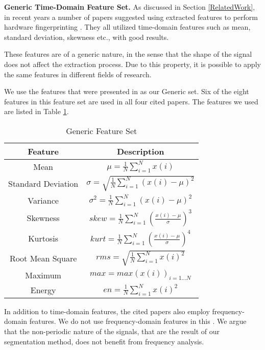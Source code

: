 \documentclass[compsoc,conference,a4paper,10pt,times]{IEEEtran}
\begin{document}
{\bf Generic Time-Domain Feature Set.}
  As discussed in Section \ref{RelatedWork}, in recent years a number of papers suggested using extracted features to perform hardware fingerprinting \cite{dey2014accelprint, choi2018identifying, choi2018voltageids, kneib2018scission}. They all utilized time-domain features such as mean, standard deviation, skewness etc., with good results.
  
  These features are of a generic nature, in the sense that the shape of the signal does not affect the extraction process. Due to this property, it is possible to apply the same features in different fields of research.
  
  We use the features that were presented in \cite{kneib2018scission} as our Generic set. Six of the eight features in this feature set are used in all four cited papers. The features we used are listed in Table \ref{tab:generic_feature_set}.
  
  \begin{table}
    \caption{Generic Feature Set}
    \label{tab:generic_feature_set}
    \centering
    \begin{tabular}{|c c|} 
      \hline
      Feature & Description \\ [0.5ex] 
      \hline\hline
      Mean & \(\mu = \frac{1}{N}\sum_{i=1}^{N}x(i)\) \\
      \hline
      Standard Deviation & \(\sigma = \sqrt{\frac{1}{N}\sum_{i=1}^{N}(x(i)-\mu)^2}\) \\
      \hline
      Variance & \(\sigma^2 = \frac{1}{N}\sum_{i=1}^{N}(x(i)-\mu)^2\) \\
      \hline
      Skewness & \(skew = \frac{1}{N} \sum_{i=1}^{N}(\frac{x(i)-\mu}{\sigma})^3\) \\
      \hline
      Kurtosis & \(kurt = \frac{1}{N} \sum_{i=1}^{N}(\frac{x(i)-\mu}{\sigma})^4\) \\
      \hline
      Root Mean Square & \(rms = \sqrt{\frac{1}{N}\sum_{i=1}^{N}x(i)^2}\) \\
      \hline
      Maximum & \(max = max(x(i))_{i=1...N}\) \\
      \hline
      Energy & \(en = \frac{1}{N}\sum_{i=1}^{N}x(i)^2\) \\
      \hline
    \end{tabular}
  \end{table}
  
  In addition to time-domain features, the cited papers also employ frequency-domain features. We do not use frequency-domain features in this \iftoggle{paper} {paper} {work}. We argue that the non-periodic nature of the signals, that are the result of our segmentation method, does not benefit from frequency analysis.
\end{document}
